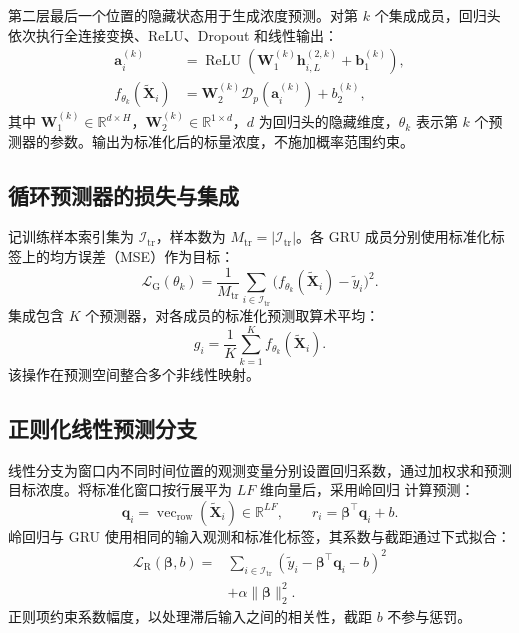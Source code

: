 第二层最后一个位置的隐藏状态用于生成浓度预测。对第 $k$ 个集成成员，回归头依次执行全连接变换、ReLU、Dropout 和线性输出：
\begin{align}
    \mathbf{a}_i^{(k)}&=\operatorname{ReLU}
    (\mathbf{W}_{1}^{(k)}\mathbf{h}_{i,L}^{(2,k)}
    +\mathbf{b}_{1}^{(k)}),
    \label{eq:head_hidden}\\
    f_{\theta_k}(\widetilde{\mathbf{X}}_i)&=
    \mathbf{W}_{2}^{(k)}\mathcal{D}_{p}(\mathbf{a}_i^{(k)})+b_{2}^{(k)},
    \label{eq:head_output}
\end{align}
其中 $\mathbf{W}_{1}^{(k)}\in\mathbb{R}^{d\times H}$，$\mathbf{W}_{2}^{(k)}\in\mathbb{R}^{1\times d}$，$d$ 为回归头的隐藏维度，$\theta_k$ 表示第 $k$ 个预测器的参数。输出为标准化后的标量浓度，不施加概率范围约束。

\subsection{循环预测器的损失与集成}
\label{sec:method:ensemble}

记训练样本索引集为 $\mathcal{I}_{\mathrm{tr}}$，样本数为 $M_{\mathrm{tr}}=|\mathcal{I}_{\mathrm{tr}}|$。各 GRU 成员分别使用标准化标签上的均方误差（MSE）作为目标：
\begin{equation}
    \mathcal{L}_{\mathrm{G}}(\theta_k)=
    \frac{1}{M_{\mathrm{tr}}}
    \sum_{i\in\mathcal{I}_{\mathrm{tr}}}
    \bigl(f_{\theta_k}(\widetilde{\mathbf{X}}_i)-\widetilde{y}_i\bigr)^2.
    \label{eq:gru_loss}
\end{equation}
集成包含 $K$ 个预测器，对各成员的标准化预测取算术平均：
\begin{equation}
    g_i=\frac{1}{K}\sum_{k=1}^{K}
    f_{\theta_k}(\widetilde{\mathbf{X}}_i).
    \label{eq:ensemble}
\end{equation}
该操作在预测空间整合多个非线性映射。

\subsection{正则化线性预测分支}
\label{sec:method:ridge}

线性分支为窗口内不同时间位置的观测变量分别设置回归系数，通过加权求和预测目标浓度。将标准化窗口按行展平为 $LF$ 维向量后，采用岭回归\citep{hoerl1970ridge} 计算预测：
\begin{equation}
    \mathbf{q}_i=\operatorname{vec}_{\mathrm{row}}
    (\widetilde{\mathbf{X}}_i)\in\mathbb{R}^{LF},
    \qquad r_i=\boldsymbol{\beta}^{\top}\mathbf{q}_i+b.
    \label{eq:ridge_prediction}
\end{equation}
岭回归与 GRU 使用相同的输入观测和标准化标签，其系数与截距通过下式拟合：
\begin{equation}
    \begin{split}
    \mathcal{L}_{\mathrm{R}}(\boldsymbol{\beta},b)
    =&\sum_{i\in\mathcal{I}_{\mathrm{tr}}}
    (\widetilde{y}_i-\boldsymbol{\beta}^{\top}\mathbf{q}_i-b)^2\\
    &+\alpha\lVert\boldsymbol{\beta}\rVert_2^2.
    \end{split}
    \label{eq:ridge_loss}
\end{equation}
正则项约束系数幅度，以处理滞后输入之间的相关性，截距 $b$ 不参与惩罚。


